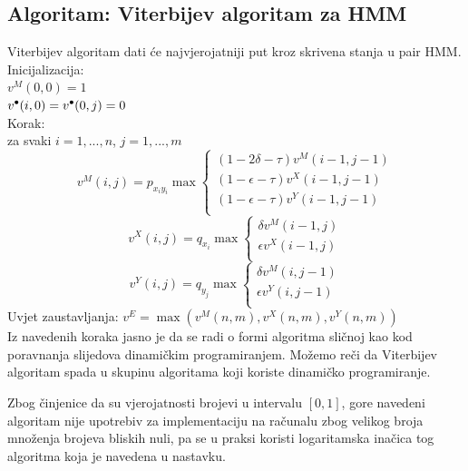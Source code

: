 \documentclass[a4paper]{article}
\newcommand\tab[1][1cm]{\hspace*{#1}}
\newcommand\sbullet[1][.5]{\mathbin{\vcenter{\hbox{\scalebox{#1}{$\bullet$}}}}}
\begin{document}
\subsection{Algoritam: Viterbijev algoritam za HMM \cite{hmm_algorithms}}
Viterbijev algoritam dati će najvjerojatniji put kroz skrivena stanja u pair HMM. 
\newline\newline
Inicijalizacija: \\
\tab \tab $v^M(0,0) = 1$\\
\tab \tab $v^{\sbullet[.75]}(i,0) = v^{\sbullet[.75]}(0,j) = 0$\\
Korak:\\
\tab za svaki $i=1,...,n$, $j=1,...,m$ \\
\begin{equation}
     v^M(i,j) = p_{x_iy_i} \max
    \begin{cases}
      (1 - 2\delta - \tau)v^M(i-1,j-1)\\
      (1-\epsilon-\tau)v^X(i-1,j-1)\\
      (1-\epsilon - \tau)v^Y(i-1,j-1)\\          
    \end{cases}
\end{equation}
\begin{equation}
     v^X(i,j) = q_{x_i}\max
    \begin{cases}
      \delta v^M(i-1,j)\\
      \epsilon v^X(i-1,j)\\
    \end{cases}   
\end{equation}
\begin{equation}
     v^Y(i,j) = q_{y_j}\max
    \begin{cases}
      \delta v^M(i,j-1)\\
      \epsilon v^Y(i,j-1)\\
    \end{cases}   
\end{equation}
Uvjet zaustavljanja:
$v^E = \max(v^M(n,m), v^X(n,m), v^Y(n,m))$ \\

\noindent
Iz navedenih koraka jasno je da se radi o formi algoritma sličnoj kao kod poravnanja slijedova dinamičkim programiranjem. Možemo reči da Viterbijev algoritam spada u skupinu algoritama koji koriste dinamičko programiranje.

\noindent
Zbog činjenice da su vjerojatnosti brojevi u intervalu $[0,1]$, gore navedeni algoritam nije upotrebiv za implementaciju na računalu zbog velikog broja množenja brojeva bliskih nuli, pa se u praksi koristi logaritamska inačica tog algoritma koja je navedena u nastavku.  
\end{document}
